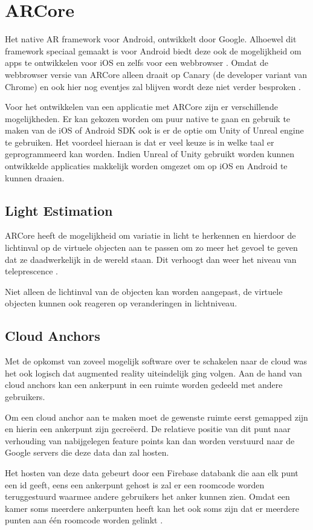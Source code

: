 \section{ARCore}
Het native AR framework voor Android, ontwikkelt door Google. Alhoewel dit framework speciaal gemaakt is voor Android biedt deze ook de mogelijkheid om apps te ontwikkelen voor iOS en zelfs voor een webbrowser \autocite{ARCoreOverview}. Omdat de webbrowser versie van ARCore alleen draait op Canary (de developer variant van Chrome) en ook hier nog eventjes zal blijven wordt deze niet verder besproken \autocite{ARCoreWeb}.

Voor het ontwikkelen van een applicatie met ARCore zijn er verschillende mogelijkheden. Er kan gekozen worden om puur native te gaan en gebruik te maken van de iOS of Android SDK ook is er de optie om Unity of Unreal engine te gebruiken. Het voordeel hieraan is dat er veel keuze is in welke taal er geprogrammeerd kan worden. Indien Unreal of Unity gebruikt worden kunnen ontwikkelde applicaties makkelijk worden omgezet om op iOS en Android te kunnen draaien. 

\subsection{Light Estimation}
ARCore heeft de mogelijkheid om variatie in licht te herkennen en hierdoor de lichtinval op de virtuele objecten aan te passen om zo meer het gevoel te geven dat ze daadwerkelijk in de wereld staan. Dit verhoogt dan weer het niveau van teleprescence \autocite{ARCoreConcepts}.

Niet alleen de lichtinval van de objecten kan worden aangepast, de virtuele objecten kunnen ook reageren op veranderingen in lichtniveau.
\subsection{Cloud Anchors}
Met de opkomst van zoveel mogelijk software over te schakelen naar de cloud was het ook logisch dat augmented reality uiteindelijk ging volgen. Aan de hand van cloud anchors kan een ankerpunt in een ruimte worden gedeeld met andere gebruikers. 

Om een cloud anchor aan te maken moet de gewenste ruimte eerst gemapped zijn en hierin een ankerpunt zijn gecreëerd. De relatieve positie van dit punt naar verhouding van nabijgelegen feature points kan dan worden verstuurd naar de Google servers die deze data dan zal hosten. 

Het hosten van deze data gebeurt door een Firebase databank die aan elk punt een id geeft, eens een ankerpunt gehost is zal er een roomcode worden teruggestuurd waarmee andere gebruikers het anker kunnen zien. Omdat een kamer soms meerdere ankerpunten heeft kan het ook soms zijn dat er meerdere punten aan één roomcode worden gelinkt \autocite{ARCoreCloudAnchors}.
